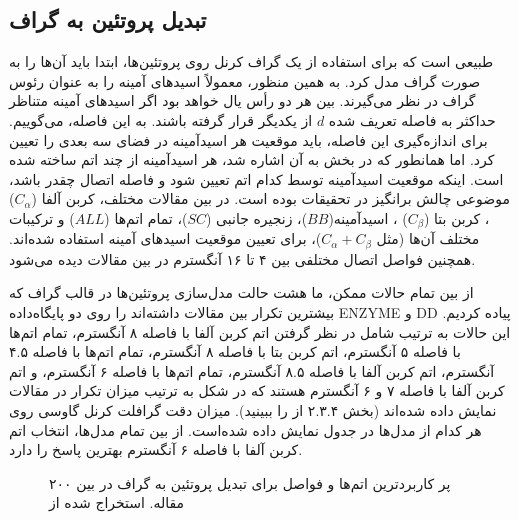 \subsection{تبدیل پروتئین به گراف}\label{sec:protein-to-graph}
طبیعی است که برای استفاده از یک گراف کرنل روی پروتئین‌ها، ابتدا باید آن‌ها را به صورت گراف مدل کرد. به همین منظور، معمولاً اسید‌های آمینه را به عنوان رئوس گراف در نظر می‌گیرند. بین هر دو رأس یال خواهد بود اگر اسیدهای آمینه متناظر حداکثر به فاصله تعریف شده $d$ از یکدیگر قرار گرفته باشند. به این فاصله،  می‌گوییم. برای اندازه‌گیری این فاصله، باید موقعیت هر اسیدآمینه در فضای سه بعدی را تعیین کرد. اما همانطور که در بخش  به آن اشاره شد، هر اسیدآمینه از چند اتم ساخته شده است. اینکه موقعیت اسیدآمینه توسط کدام اتم تعیین شود و فاصله اتصال چقدر باشد، موضوعی چالش برانگیز در تحقیقات بوده است. در بین مقالات مختلف، کربن آلفا 
($C_\alpha$)
، کربن بتا
($C_\beta$)
،  اسیدآمینه($BB$)، زنجیره جانبی ($SC$)، تمام اتم‌ها ($ALL$) و ترکیبات مختلف آن‌ها (مثل $C_\alpha+C_\beta$)، برای تعیین موقعیت اسید‌های آمینه استفاده شده‌اند. همچنین فواصل اتصال مختلفی بین ۴ تا ۱۶ آنگسترم در بین مقالات دیده می‌شود.

از بین تمام حالات ممکن، ما هشت حالت مدل‌سازی پروتئین‌ها در قالب گراف که بیشترین تکرار بین مقالات داشته‌اند را روی دو پایگاه‌داده ENZYME و DD پیاده کردیم. این حالات به ترتیب شامل در نظر گرفتن اتم کربن آلفا با فاصله ۸ آنگسترم، تمام اتم‌ها با فاصله ۵ آنگسترم، اتم کربن بتا با فاصله ۸ آنگسترم، تمام اتم‌ها با فاصله ۴.۵ آنگسترم، اتم کربن آلفا با فاصله ۸.۵ آنگسترم، تمام اتم‌ها با فاصله ۶ آنگسترم، و اتم کربن آلفا با فاصله ۷ و ۶ آنگسترم هستند که در شکل  به ترتیب میزان تکرار در مقالات نمایش داده شده‌اند (بخش ۲.۳.۴ از  را ببینید). میزان دقت گرافلت کرنل گاوسی روی هر کدام از مدل‌ها در جدول  نمایش داده شده‌است. از بین تمام مدل‌ها، انتخاب اتم کربن آلفا با فاصله ۶ آنگسترم بهترین پاسخ را دارد.

\begin{figure}[ht]
\caption[پرکاربردترین تنظیمات برای ایجاد گراف از پروتئین]{پر کاربرد‌ترین اتم‌ها و فواصل برای تبدیل پروتئین به گراف در بین ۲۰۰ مقاله. استخراج شده از }
\label{fig:rig-occurance}
\end{figure}

